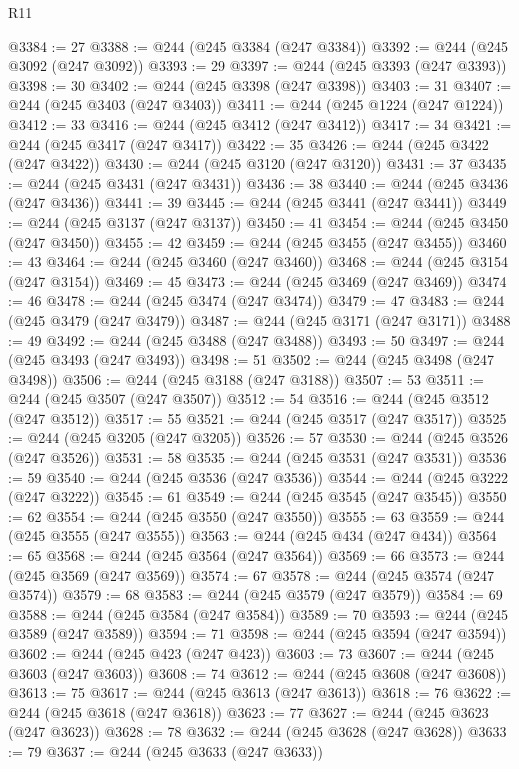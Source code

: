 \begin{lexlean}{R11}
\begin{coremodule}
{{{{{{{{{{{{{{{{{{{{{{{{{{{{{{{{{{{{{{{{{{{{{{{{{{{{{{{{{{{{{{{{{{{{{{{{{{{{{{{{{{@3384 := 27
@3388 := @244 (@245 @3384 (@247 @3384))
@3392 := @244 (@245 @3092 (@247 @3092))
@3393 := 29
@3397 := @244 (@245 @3393 (@247 @3393))
@3398 := 30
@3402 := @244 (@245 @3398 (@247 @3398))
@3403 := 31
@3407 := @244 (@245 @3403 (@247 @3403))
@3411 := @244 (@245 @1224 (@247 @1224))
@3412 := 33
@3416 := @244 (@245 @3412 (@247 @3412))
@3417 := 34
@3421 := @244 (@245 @3417 (@247 @3417))
@3422 := 35
@3426 := @244 (@245 @3422 (@247 @3422))
@3430 := @244 (@245 @3120 (@247 @3120))
@3431 := 37
@3435 := @244 (@245 @3431 (@247 @3431))
@3436 := 38
@3440 := @244 (@245 @3436 (@247 @3436))
@3441 := 39
@3445 := @244 (@245 @3441 (@247 @3441))
@3449 := @244 (@245 @3137 (@247 @3137))
@3450 := 41
@3454 := @244 (@245 @3450 (@247 @3450))
@3455 := 42
@3459 := @244 (@245 @3455 (@247 @3455))
@3460 := 43
@3464 := @244 (@245 @3460 (@247 @3460))
@3468 := @244 (@245 @3154 (@247 @3154))
@3469 := 45
@3473 := @244 (@245 @3469 (@247 @3469))
@3474 := 46
@3478 := @244 (@245 @3474 (@247 @3474))
@3479 := 47
@3483 := @244 (@245 @3479 (@247 @3479))
@3487 := @244 (@245 @3171 (@247 @3171))
@3488 := 49
@3492 := @244 (@245 @3488 (@247 @3488))
@3493 := 50
@3497 := @244 (@245 @3493 (@247 @3493))
@3498 := 51
@3502 := @244 (@245 @3498 (@247 @3498))
@3506 := @244 (@245 @3188 (@247 @3188))
@3507 := 53
@3511 := @244 (@245 @3507 (@247 @3507))
@3512 := 54
@3516 := @244 (@245 @3512 (@247 @3512))
@3517 := 55
@3521 := @244 (@245 @3517 (@247 @3517))
@3525 := @244 (@245 @3205 (@247 @3205))
@3526 := 57
@3530 := @244 (@245 @3526 (@247 @3526))
@3531 := 58
@3535 := @244 (@245 @3531 (@247 @3531))
@3536 := 59
@3540 := @244 (@245 @3536 (@247 @3536))
@3544 := @244 (@245 @3222 (@247 @3222))
@3545 := 61
@3549 := @244 (@245 @3545 (@247 @3545))
@3550 := 62
@3554 := @244 (@245 @3550 (@247 @3550))
@3555 := 63
@3559 := @244 (@245 @3555 (@247 @3555))
@3563 := @244 (@245 @434 (@247 @434))
@3564 := 65
@3568 := @244 (@245 @3564 (@247 @3564))
@3569 := 66
@3573 := @244 (@245 @3569 (@247 @3569))
@3574 := 67
@3578 := @244 (@245 @3574 (@247 @3574))
@3579 := 68
@3583 := @244 (@245 @3579 (@247 @3579))
@3584 := 69
@3588 := @244 (@245 @3584 (@247 @3584))
@3589 := 70
@3593 := @244 (@245 @3589 (@247 @3589))
@3594 := 71
@3598 := @244 (@245 @3594 (@247 @3594))
@3602 := @244 (@245 @423 (@247 @423))
@3603 := 73
@3607 := @244 (@245 @3603 (@247 @3603))
@3608 := 74
@3612 := @244 (@245 @3608 (@247 @3608))
@3613 := 75
@3617 := @244 (@245 @3613 (@247 @3613))
@3618 := 76
@3622 := @244 (@245 @3618 (@247 @3618))
@3623 := 77
@3627 := @244 (@245 @3623 (@247 @3623))
@3628 := 78
@3632 := @244 (@245 @3628 (@247 @3628))
@3633 := 79
@3637 := @244 (@245 @3633 (@247 @3633))
}}}}}}}}}}}}}}}}}}}}}}}}}}}}}}}}}}}}}}}}}}}}}}}}}}}}}}}}}}}}}}}}}}}}}}}}}}}}}}}}}}
\end{coremodule}
\end{lexlean}
